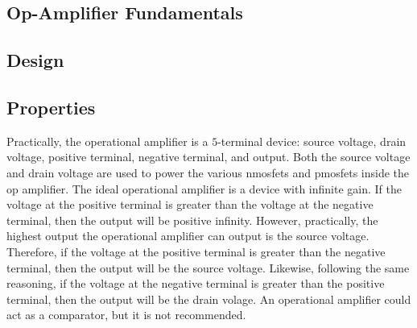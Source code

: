 \documentclass[a4paper, 12pt]{report}
\begin{document}
\begin{center}
\chapter{Op-Amplifier Fundamentals}
\begin{comment}
\end{comment}
\section{Design}
\begin{comment}
\end{comment}
\section{Properties}
\begin{comment}
\end{comment}
Practically, the operational amplifier is a $5$-terminal device: source voltage, drain voltage, positive terminal, negative terminal, and output. Both the source voltage and drain voltage are used to power the various nmosfets and pmosfets inside the op amplifier. The ideal operational amplifier is a device with infinite gain. If the voltage at the positive terminal is greater than the voltage at the negative terminal, then the output will be positive infinity. However, practically, the highest output the operational amplifier can output is the source voltage. Therefore, if the voltage at the positive terminal is greater than the negative terminal, then the output will be the source voltage. Likewise, following the same reasoning, if the voltage at the negative terminal is greater than the positive terminal, then the output will be the drain volage. An operational amplifier could act as a comparator, but it is not recommended.
\end{center}
\end{document}

